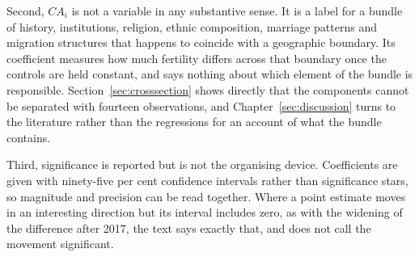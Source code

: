 Second, $CA_i$ is not a variable in any substantive sense. It is a label for a bundle of history, institutions, religion, ethnic composition, marriage patterns and migration structures that happens to coincide with a geographic boundary. Its coefficient measures how much fertility differs across that boundary once the controls are held constant, and says nothing about which element of the bundle is responsible. Section~\ref{sec:crosssection} shows directly that the components cannot be separated with fourteen observations, and Chapter~\ref{sec:discussion} turns to the literature rather than the regressions for an account of what the bundle contains.

Third, significance is reported but is not the organising device. Coefficients are given with ninety-five per cent confidence intervals rather than significance stars, so magnitude and precision can be read together. Where a point estimate moves in an interesting direction but its interval includes zero, as with the widening of the difference after 2017, the text says exactly that, and does not call the movement significant.
